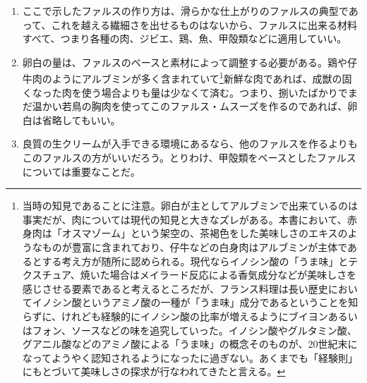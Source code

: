 \begin{recette}
\begin{enumerate}
\def\labelenumi{\arabic{enumi}.}
\setcounter{enumi}{1}
\item
  ここで示したファルスの作り方は、滑らかな仕上がりのファルスの典型であって、これを越える繊細さを出せるものはないから、ファルスに出来る材料すべて、つまり各種の肉、ジビエ、鶏、魚、甲殻類などに適用していい。
\item
  卵白の量は、ファルスのベースと素材によって調整する必要がある。鶏や仔牛肉のようにアルブミンが多く含まれていて\footnote{当時の知見であることに注意。卵白が主としてアルブミンで出来ているのは事実だが、肉については現代の知見と大きなズレがある。本書において、赤身肉は「オスマゾーム」という架空の、茶褐色をした美味しさのエキスのようなものが豊富に含まれており、仔牛などの白身肉はアルブミンが主体であるとする考え方が随所に認められる。現代ならイノシン酸の「うま味」とテクスチュア、焼いた場合はメイラード反応による香気成分などが美味しさを感じさせる要素であると考えるところだが、フランス料理は長い歴史においてイノシン酸というアミノ酸の一種が「うま味」成分であるということを知らずに、けれども経験的にイノシン酸の比率が増えるようにブイヨンあるいはフォン、ソースなどの味を追究していった。イノシン酸やグルタミン酸、グアニル酸などのアミノ酸による「うま味」の概念そのものが、20世紀末になってようやく認知されるようになったに過ぎない。あくまでも「経験則」にもとづいて美味しさの探求が行なわれてきたと言える。}新鮮な肉であれば、成獣の固くなった肉を使う場合よりも量は少なくて済む。つまり、捌いたばかりでまだ温かい若鳥の胸肉を使ってこのファルス・ムスーズを作るのであれば、卵白は省略してもいい。
\item
  良質の生クリームが入手できる環境にあるなら、他のファルスを作るよりもこのファルスの方がいいだろう。とりわけ、甲殻類をベースとしたファルスについては重要なことだ。
\end{enumerate}

\end{recette}

